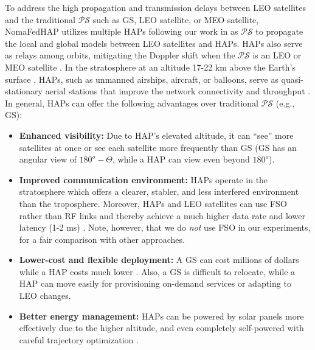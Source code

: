 \documentclass[letter,journal]{IEEEtran}
\begin{document}
To address the high propagation and transmission delays between LEO satellites and the traditional $\mathcal {PS}$ such as GS, LEO satellite, or MEO satellite, NomaFedHAP utilizes multiple HAPs following our work in \cite{happaper} as $\mathcal {PS}$ to propagate the local and global models between LEO satellites and HAPs. HAPs also serve as relays among orbits, mitigating the Doppler shift when the $\mathcal{PS}$ is an LEO or MEO satellite \cite{razmi, wu2022dsfl}. In the stratosphere at an altitude 17-22 km above the Earth's surface \cite{alsharoa2020improvement}, HAPs, such as unmanned airships, aircraft, or balloons, serve as quasi-stationary aerial stations that improve the network connectivity and throughput \cite{jia2020joint}. %
In general, HAPs can offer the following advantages over traditional $\mathcal {PS}$ (e.g., GS):
\begin{itemize} %
    \item {\bf Enhanced visibility:} Due to HAP's elevated altitude, it can ``see'' more satellites at once or see each satellite more frequently than GS (GS has an angular view of $180^o -  \Theta$, while a HAP can view even beyond $180^o$).
    
     \item {\bf Improved communication environment:} HAPs operate in the stratosphere which offers a clearer, stabler, and less interfered environment than the troposphere. Moreover, HAPs and LEO satellites can use FSO rather than RF links and thereby achieve a much higher data rate and lower latency (1-2 ms) \cite{xing2021high,hsieh2020uav}. Note, however, that we do {\em not} use FSO in our experiments, for a fair comparison with other approaches.
    
    \item  {\bf Lower-cost and flexible deployment:} A GS can cost millions of dollars while a HAP costs much lower \cite{hap,kurt2021vision}. Also, a GS is difficult to relocate, while a HAP can move easily for provisioning on-demand services or adapting to LEO changes.%

    \item {\bf Better energy management:} HAPs can be powered by solar panels more effectively due to the higher altitude, and even completely self-powered with careful trajectory optimization \cite{marriott2020trajectory}.
\end{itemize}
\end{document}
